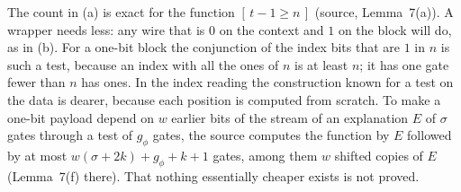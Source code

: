 The count in (a) is exact for the function $[\,t-1\ge n\,]$ (source, Lemma~7(a)). A wrapper needs less: any
wire that is $0$ on the context and $1$ on the block will do, as in (b). For a one-bit block the conjunction
of the index bits that are $1$ in $n$ is such a test, because an index with all the ones of $n$ is at least
$n$; it has one gate fewer than $n$ has ones. In the index reading the construction known for a test on the
data is dearer, because each position is computed from scratch. To make a one-bit payload depend on $w$
earlier bits of the stream of an explanation $E$ of $\sigma$ gates through a test of $g_\phi$ gates, the
source computes the function by $E$ followed by at most $w(\sigma+2k)+g_\phi+k+1$ gates, among them $w$
shifted copies of $E$ (Lemma~7(f) there). That nothing essentially cheaper exists is not proved.

